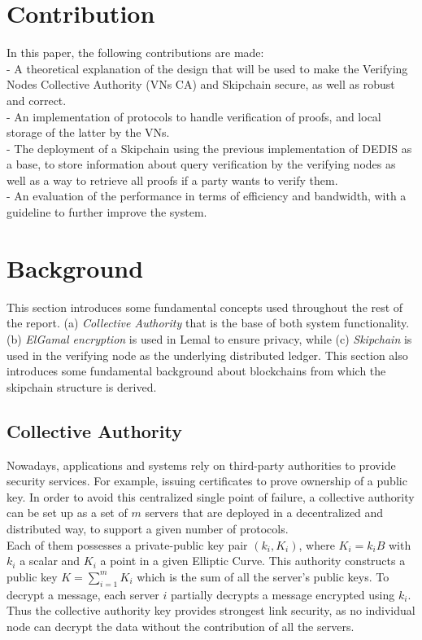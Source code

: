 \documentclass{article}
\begin{document}
\section{Contribution}
In this paper, the following contributions are made:\\


- A theoretical explanation of the design that will be used to make the Verifying Nodes Collective Authority (VNs CA) and Skipchain secure, as well as robust and correct.\\


- An implementation of protocols to handle verification of proofs, and local storage of the latter by the VNs.\\


- The deployment of a Skipchain using the previous implementation of DEDIS as a base, to store information about query verification by the verifying nodes as well as a way to retrieve all proofs if a party wants to verify them.\\


- An evaluation of the performance in terms of efficiency and bandwidth, with a guideline to further improve the system.\\

\section{Background}
This section introduces some fundamental concepts used throughout the rest of the report. (a) \textit{Collective Authority} that is the base of both system functionality. (b) \textit{ElGamal encryption} is used in Lemal to ensure privacy, while (c) \textit{Skipchain} is used in the verifying node as the underlying distributed ledger. This section also introduces some fundamental background about blockchains from which the skipchain structure is derived.

\subsection{Collective Authority}
Nowadays, applications and systems rely on third-party authorities to provide security services. For example, issuing certificates to prove ownership of a public key. In order to avoid this centralized single point of failure, a collective authority can be set up as a set of $m$  servers that are deployed in a decentralized and distributed way, to support a given number of protocols.\\
Each of them possesses a private-public key pair $(k_i,K_i)$, where $K_i = k_i B$ with $k_i$ a scalar and $K_i$ a point in a given Elliptic Curve. This authority constructs a public key $K = \sum_{i=1}^{m}{K_i}$ which is the sum of all the server's public keys. To decrypt a message, each server $i$ partially decrypts a message encrypted using $k_{i}$. Thus the collective authority key provides strongest link security, as no individual node can decrypt the data without the contribution of all the servers.
\end{document}

